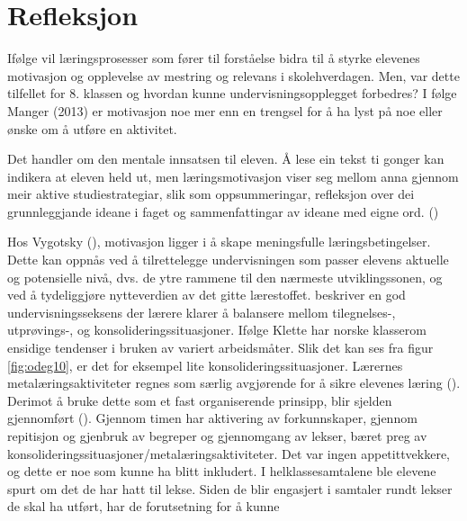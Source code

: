 \documentclass[main.tex]{subfiles}
\begin{document}
\section*{Refleksjon}
\label{sec:3}

Ifølge  vil læringsprosesser som fører til forståelse bidra til å styrke elevenes 
motivasjon og opplevelse av mestring og relevans i skolehverdagen. Men, var dette tilfellet for 8. 
klassen og hvordan kunne undervisningsopplegget forbedres?
\newline
\newline
I følge Manger (2013) er motivasjon noe mer enn en trengsel for å ha lyst på noe eller ønske om å 
utføre en aktivitet.
\begin{displayquote}
Det handler om den mentale innsatsen til eleven. Å lese ein tekst ti gonger kan indikera at eleven held ut, men  
læringsmotivasjon viser seg mellom anna gjennom meir aktive studiestrategiar, slik som 
oppsummeringar, refleksjon over dei grunnleggjande ideane i faget og sammenfattingar av ideane med 
eigne ord. ()
\end{displayquote}
Hos Vygotsky (), motivasjon ligger i å skape meningsfulle læringsbetingelser. 
Dette kan oppnås ved å tilrettelegge undervisningen som passer elevens aktuelle og potensielle nivå, 
dvs. de ytre rammene til den nærmeste utviklingssonen, og ved å tydeliggjøre nytteverdien av det gitte 
lærestoffet.
\newline
\newline
{} beskriver en god undervisningsseksens der lærere klarer å balansere mellom 
tilegnelses-, utprøvings-, og konsolideringssituasjoner. Ifølge Klette har norske klasserom ensidige 
tendenser i bruken av variert arbeidsmåter. Slik det kan ses fra figur \ref{fig:odeg10}, er det for 
eksempel lite konsolideringssituasjoner. Lærernes metalæringsaktiviteter regnes som særlig 
avgjørende for å sikre elevenes læring (). Derimot å bruke dette som et fast
organiserende prinsipp, blir sjelden gjennomført (). Gjennom timen har 
aktivering av forkunnskaper, gjennom repitisjon og gjenbruk av begreper og gjennomgang av 
lekser, bæret preg av konsolideringssituasjoner/metalæringsaktiviteter. Det var ingen 
appetittvekkere, og dette er noe som kunne ha blitt inkludert.
\newline
\newline
I helklassesamtalene ble elevene spurt om det de har hatt til lekse.
Siden de blir engasjert i samtaler rundt lekser de skal ha utført, har de forutsetning for å kunne 
\end{document}
